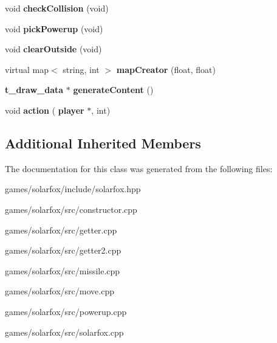 \begin{DoxyCompactItemize}
void {\bfseries check\+Collision} (void)
\item 
\mbox{\label{classsolarfox_a8a5ab035998af2e54bbf604c3c78bc3f}} 
void {\bfseries pick\+Powerup} (void)
\item 
\mbox{\label{classsolarfox_a1e4515f7e21deedf0e78162e29c8af48}} 
void {\bfseries clear\+Outside} (void)
\item 
\mbox{\label{classsolarfox_ac4694604f7cbeccd29c5bbcc0b277cde}} 
virtual map$<$ string, int $>$ {\bfseries map\+Creator} (float, float)
\item 
\mbox{\label{classsolarfox_aabce5ca313f8bcdbd41a7903ed9ea738}} 
\textbf{ t\+\_\+draw\+\_\+data} $\ast$ {\bfseries generate\+Content} ()
\item 
\mbox{\label{classsolarfox_a01d97c5df64680bdb82ba2b06e87ae9e}} 
void {\bfseries action} (\textbf{ player} $\ast$, int)
\end{DoxyCompactItemize}
\subsection*{Additional Inherited Members}


The documentation for this class was generated from the following files\+:\begin{DoxyCompactItemize}
\item 
games/solarfox/include/solarfox.\+hpp\item 
games/solarfox/src/constructor.\+cpp\item 
games/solarfox/src/getter.\+cpp\item 
games/solarfox/src/getter2.\+cpp\item 
games/solarfox/src/missile.\+cpp\item 
games/solarfox/src/move.\+cpp\item 
games/solarfox/src/powerup.\+cpp\item 
games/solarfox/src/solarfox.\+cpp\end{DoxyCompactItemize}
